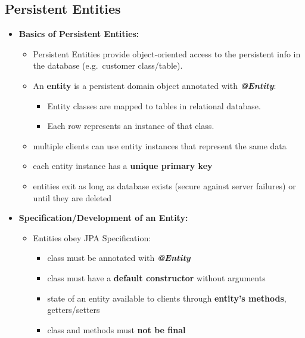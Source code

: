 \documentclass[ieeetran]{article}
\begin{document}
\subsection{Persistent Entities} %
\label{sub:persistent_entities}
\begin{itemize}
  \item \textbf{Basics of Persistent Entities:}
	  \begin{itemize}
	    \item Persistent Entities provide object-oriented access to the persistent info in the database (e.g.\ customer class/table).
    \item An \textbf{entity} is a persistent domain object annotated with \textit{\textbf{@Entity}}:
	    \begin{itemize}
	      \item Entity classes are mapped to tables in relational database.
		  \item Each row represents an instance of that class.
	    \end{itemize}

    \item multiple clients can use entity instances that represent the same data
	 \item each entity instance has a \textbf{unique primary key}
	\item entities exit as long as database exists (secure against server failures) or until they are deleted
	  \end{itemize}

\item \textbf{Specification/Development of an Entity:}
	\begin{itemize}
	  \item Entities obey JPA Specification:
		  \begin{itemize}
		    \item class must be annotated with \textbf{\textit{@Entity}}
		\item class must have a \textbf{default constructor} without arguments
	\item state of an entity available to clients through \textbf{entity's methods}, getters/setters
	\item class and methods must \textbf{not be final}
		  \end{itemize}


\end{itemize}
\end{itemize}
\end{document}
